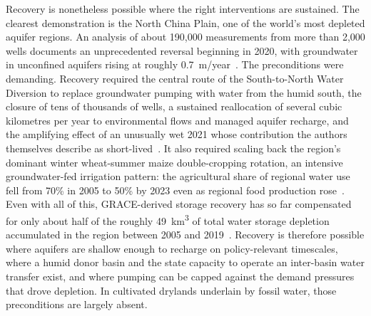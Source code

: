 Recovery is nonetheless possible where the right interventions are sustained. The clearest demonstration is the North China Plain, one of the world's most depleted aquifer regions. An analysis of about 190{,}000 measurements from more than 2{,}000 wells documents an unprecedented reversal beginning in 2020, with groundwater in unconfined aquifers rising at roughly 0.7~m/year~\cite[Abstract; p.~3]{long2025aquifer}. The preconditions were demanding. Recovery required the central route of the South-to-North Water Diversion to replace groundwater pumping with water from the humid south, the closure of tens of thousands of wells, a sustained reallocation of several cubic kilometres per year to environmental flows and managed aquifer recharge, and the amplifying effect of an unusually wet 2021 whose contribution the authors themselves describe as short-lived~\cite[Abstract; pp.~5--8]{long2025aquifer}. It also required scaling back the region's dominant winter wheat-summer maize double-cropping rotation, an intensive groundwater-fed irrigation pattern: the agricultural share of regional water use fell from 70\% in 2005 to 50\% by 2023 even as regional food production rose~\cite[pp.~5--6]{long2025aquifer}. Even with all of this, GRACE-derived storage recovery has so far compensated for only about half of the roughly 49~km\textsuperscript{3} of total water storage depletion accumulated in the region between 2005 and 2019~\cite[p.~7]{long2025aquifer}. Recovery is therefore possible where aquifers are shallow enough to recharge on policy-relevant timescales, where a humid donor basin and the state capacity to operate an inter-basin water transfer exist, and where pumping can be capped against the demand pressures that drove depletion. In cultivated drylands underlain by fossil water, those preconditions are largely absent.

